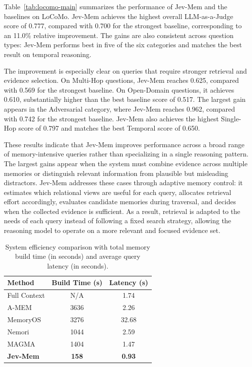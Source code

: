 \documentclass[11pt]{article}
\begin{document}
Table~\ref{tab:locomo-main} summarizes the performance of Jev-Mem and the baselines on LoCoMo. Jev-Mem achieves the highest overall LLM-as-a-Judge score of 0.777, compared with 0.700 for the strongest baseline, corresponding to an 11.0\% relative improvement. The gains are also consistent across question types: Jev-Mem performs best in five of the six categories and matches the best result on temporal reasoning.

The improvement is especially clear on queries that require stronger retrieval and evidence selection. On Multi-Hop questions, Jev-Mem reaches 0.625, compared with 0.569 for the strongest baseline. On Open-Domain questions, it achieves 0.610, substantially higher than the best baseline score of 0.517. The largest gain appears in the Adversarial category, where Jev-Mem reaches 0.962, compared with 0.742 for the strongest baseline. Jev-Mem also achieves the highest Single-Hop score of 0.797 and matches the best Temporal score of 0.650.

These results indicate that Jev-Mem improves performance across a broad range of memory-intensive queries rather than specializing in a single reasoning pattern. The largest gains appear when the system must combine evidence across multiple memories or distinguish relevant information from plausible but misleading distractors. Jev-Mem addresses these cases through adaptive memory control: it estimates which relational views are useful for each query, allocates retrieval effort accordingly, evaluates candidate memories during traversal, and decides when the collected evidence is sufficient. As a result, retrieval is adapted to the needs of each query instead of following a fixed search strategy, allowing the reasoning model to operate on a more relevant and focused evidence set.


\begin{table}[t]
\centering
\setlength{\tabcolsep}{3.5pt}
\caption{System efficiency comparison with total memory build time (in seconds) and average query latency (in seconds).}
\label{tab:system_perf}
\begin{tabular}{l c c}
\toprule
{Method} & {Build Time (s)} & {Latency (s)} \\
\midrule
Full Context    & N/A    & 1.74 \\
A-MEM           & 3636   & 2.26 \\
MemoryOS        & 3276   & 32.68 \\
Nemori          & 1044   & 2.59 \\
MAGMA           & 1404   & 1.47 \\

\textbf{Jev-Mem} & \textbf{158} & \textbf{0.93} \\

\bottomrule
\end{tabular}
\end{table}
\end{document}
